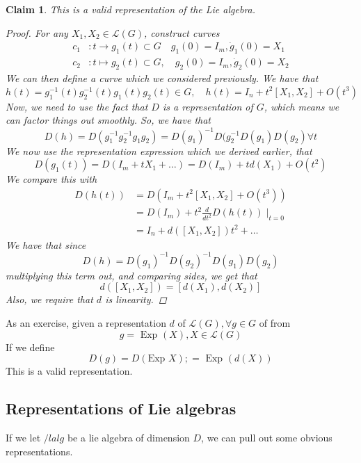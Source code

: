 \documentclass[11pt, oneside]{article}   	%
\theoremstyle{slanted}
\newtheorem*{claim}{Claim}
\newtheorem*{defn}{Definition}
\newcommand{\lalg}{ \mathcal{ G } }
\begin{document}
\begin{claim}
	This is a valid representation 
	of the Lie algebra. 

\begin{proof}
	For any $ X _ 1 , X _ 2 \in \mathcal{ L } ( G ) $, 
	construct curves 
	\begin{align*}
		c_1 & : t \to g_ 1 ( t ) \subset G \quad g_1 ( 0 )  = I_ m, \dot{g }_ 1  ( 0 ) = X_ 1   \\
		c_ 2 & : t \mapsto g _ 2 ( t) \subset G , \quad g _ 2 ( 0 ) = I _ m, \dot{ g } _ 2 ( 0 ) = X_ 2  
	\end{align*}
	We can then define a curve which we 
	considered previously. We have that 
	\[
		h ( t) = g_1 ^{ - 1} ( t) g _ 2 ^{ - 1} ( t) g_ 1 ( t) g _ 2 ( t ) \in G, \quad h ( t) = I _ n + t ^ 2 [ X_1, X_2 ] + O ( t^ 3 ) 
	\] Now, we need to use the fact 
	that $ D $ is a representation of $ G $, which means 
	we can factor things out smoothly. 
	So, we have that 
	\[ 
		D ( h ) = D ( g_1 ^{ - 1 } g_2  ^{ -1 } g_1 g_2 ) = D ( g_1 )  ^{ - 1} D ( g_ 2 ^{ - 1} D ( g_1 ) D( g_2) \forall t 
	\] We now use the representation expression which 
	we derived earlier, that 
	\[
		D ( g_1 ( t ) ) = D ( I _ m + t X_1 + \dots ) = D ( I _ m ) + t d ( X_1 ) + O ( t ^ 2 ) 
	\] We compare this with 
	\begin{align*}
		D ( h ( t ) ) & = D ( I _ m  + t ^ 2 [ X_1 , X_2 ] + O ( t ^ 3 ) ) \\
			      &=  D ( I _ m ) + t ^ 2 \frac{ d }{ dt ^ 2 } D ( h ( t ) ) \mid_{ t = 0 } \\
			      &=  I _ n + d ( [ X_1 , X_2 ] ) t ^ 2 + \dots  
	\end{align*}
	We have that since
	\[
		D ( h ) = D ( g_1 ) ^{ -1 } D ( g_2 ) ^{ - 1} D ( g_1) D ( g_2) 
	\] multiplying this term out, and comparing sides, we get that 
	\[
		d ( [ X_1 , X_2 ] ) = [ d ( X_1 ) , d ( X_2 ) ] 
	\] Also, we require that $ d  $ is linearity.  
\end{proof}
\end{claim}

As an exercise, given a representation $d $ of 
$ \mathcal{L  } ( G ) , \forall g \in G $  of
from 
\[
	g = \text{ Exp } ( X ), X \in \mathcal{ L } ( G ) 
\] If we define 
\[
	D ( g ) = D ( \text{Exp } X ) ;= \text{ Exp } ( d ( X) ) 
\] This is a valid representation. 


\subsection{Representations of Lie algebras} 
If we let $ /lalg$ be a lie algebra of 
dimension $ D $, we can pull out some obvious representations. 
\begin{defn}{(Trivial Representation).
	The trivial representation $ d_0 $ is the 
	representation 
	\[
		d_ 0 ( X )  = 0 \quad \forall X \in \lalg \implies \dim ( d_0 ) = 1
	\] 
\end{defn}
\end{document}
